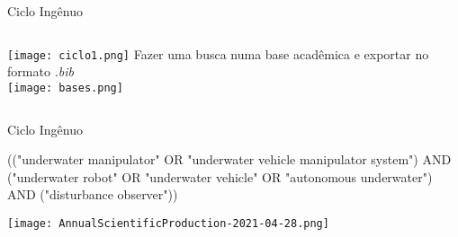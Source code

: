\begin{frame}[t]{Ciclo Ingênuo}
    
    \begin{columns}
            \centering
            \texttt{[image: ciclo1.png]}
            \centering
            Fazer uma busca numa base acadêmica e exportar no formato \emph{.bib}\\

            \vspace*{0.2cm}
            \texttt{[image: bases.png]}
    \end{columns}

\end{frame}
\begin{frame}[t]{Ciclo Ingênuo}
    

    \begin{tcolorbox}[colback=gcolor!5!white,colframe=gcolor!75!black,title=String]
        (("underwater manipulator" OR "underwater vehicle manipulator system") AND ("underwater robot" OR "underwater vehicle" OR "autonomous underwater") AND ("disturbance observer"))
    \end{tcolorbox}

    \centering
    \centerline{\texttt{[image: AnnualScientificProduction-2021-04-28.png]}}

\end{frame}
